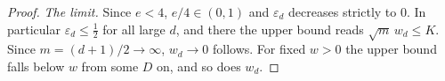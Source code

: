 \begin{proof}
\emph{The limit.} Since $e < 4$, $e/4 \in (0,1)$ and $\varepsilon_d$ decreases strictly to $0$.
In particular $\varepsilon_d \le \tfrac12$ for all large $d$, and there the upper bound reads
$\sqrt m\,w_d \le K$. Since $m = (d+1)/2 \to \infty$, $w_d \to 0$ follows. For fixed $w > 0$ the
upper bound falls below $w$ from some $D$ on, and so does $w_d$.
\end{proof}

